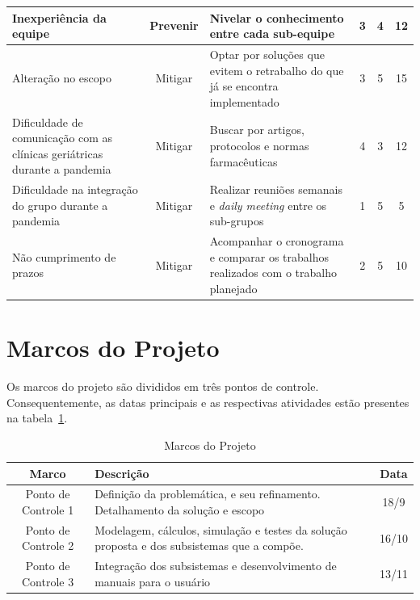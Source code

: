 \begin{apendicesenv}
\begin{table}[H]
\begin{adjustbox}{max width = \textwidth}
\begin{tabular}{|L{5cm}|c|L{4cm}|c|c|c|}
             Inexperiência da equipe  & Prevenir & Nivelar o conhecimento entre cada sub-equipe & 3 & 4 & 12 \\ \hline
             
             Alteração no escopo & Mitigar & Optar por soluções que evitem o retrabalho do que já se encontra implementado & 3 & 5 & 15 \\ \hline
             
             Dificuldade de comunicação com as clínicas geriátricas durante a pandemia & Mitigar & Buscar por artigos, protocolos e normas farmacêuticas & 4 & 3 & 12 \\ \hline
              
             Dificuldade na integração do grupo durante a pandemia & Mitigar & Realizar reuniões semanais e \textit{daily meeting} entre os sub-grupos  & 1 & 5 & 5 \\ \hline
             
             Não cumprimento de prazos & Mitigar & Acompanhar o cronograma e comparar os trabalhos realizados com o trabalho planejado & 2 & 5 & 10 \\ \hline
        \end{tabular}
    \end{adjustbox}
\end{table}

\section{Marcos do Projeto}

Os marcos do projeto são divididos em três pontos de controle. Consequentemente, as datas principais e as respectivas atividades estão presentes na tabela~\ref{tab:marcos}.

\begin{table}[H]
    \centering
    \caption{Marcos do Projeto}
    \label{tab:marcos}
    \begin{tabularx}{\textwidth}{|c|X|c|}
        \hline
        \rowcolor[HTML]{A8DADC}
        \textbf{Marco} & \textbf{Descrição} & \textbf{Data} \\ \hline
        Ponto de Controle 1 & Definição da problemática, e seu refinamento. Detalhamento da solução e escopo & 18/9 \\\hline
        Ponto de Controle 2 &  Modelagem, cálculos, simulação e testes da solução proposta e dos subsistemas que a compõe. & 16/10 \\ \hline
        Ponto de Controle 3 & Integração dos subsistemas e desenvolvimento de manuais para o usuário & 13/11 \\ \hline
    \end{tabularx}
\end{table}



\end{apendicesenv}
